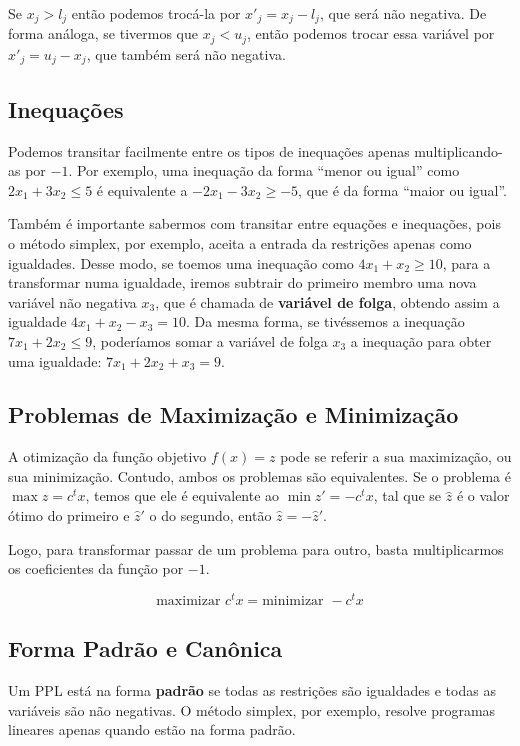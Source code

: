 Se $x_j > l_j$ então podemos trocá-la por $x'_j = x_j - l_j$, que será não negativa. De forma análoga, se tivermos que $x_j < u_j$, então podemos trocar essa variável por $x'_j = u_j - x_j$, que também será não negativa.

\subsection{Inequações}

Podemos transitar facilmente entre os tipos de inequações apenas multiplicando-as por $-1$. Por exemplo, uma inequação da forma ``menor ou igual'' como $2x_1 + 3x_2 \leq 5$  é equivalente a $-2x_1 - 3x_2 \geq -5$, que é da forma ``maior ou igual''.

Também é importante sabermos com transitar entre equações e inequações, pois o método simplex, por exemplo, aceita a entrada da restrições apenas como igualdades. Desse modo, se toemos uma inequação como $4x_1 + x_2 \geq 10$, para a transformar numa igualdade, iremos subtrair do primeiro membro uma nova variável não negativa $x_3$, que é chamada de \textbf{variável de folga}, obtendo assim a igualdade $4x_1 + x_2 - x_3 = 10$. Da mesma forma, se tivéssemos a inequação $7x_1 + 2x_2 \leq 9$, poderíamos somar a variável de folga $x_3$ a inequação para obter uma igualdade: $7x_1 + 2x_2 + x_3 = 9$.

\subsection{Problemas de Maximização e Minimização}

A otimização da função objetivo $f(x) = z$ pode se referir a sua maximização, ou sua minimização. Contudo, ambos os problemas são equivalentes. Se o problema é $\max z = c^tx$, temos que ele é equivalente ao $ \min z' = -c^tx $, tal que se $\hat{z}$ é o valor ótimo do primeiro e $\hat{z}'$ o do segundo, então $\hat{z} = -\hat{z}'$. 

Logo, para transformar passar de um problema para outro, basta multiplicarmos os coeficientes da função por $-1$.

\begin{equation*}
	\text{maximizar\ } c^tx = \text{minimizar\ } -c^tx
\end{equation*}

\subsection{Forma Padrão e Canônica}
Um PPL está na forma \textbf{padrão} se todas as restrições são igualdades e todas as variáveis são não negativas. O método simplex, por exemplo, resolve programas lineares apenas quando estão na forma padrão.

